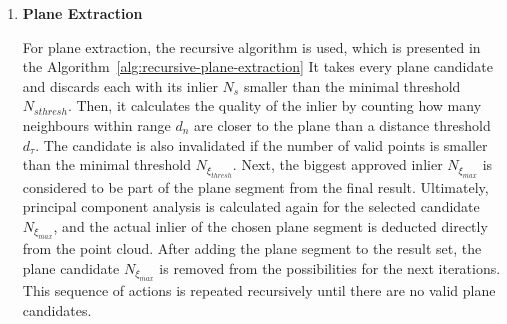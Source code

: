 \begin{enumerate}
\item \textbf{Plane Extraction}

For plane extraction, the recursive algorithm is used, which is presented in the Algorithm~\ref{alg:recursive-plane-extraction}
It takes every plane candidate and discards each with its inlier $N_s$ smaller than the minimal threshold $N_{s thresh}$.
Then, it calculates the quality of the inlier by counting how many neighbours within range $d_n$
are closer to the plane than a distance threshold $d_{\tau}$.
The candidate is also invalidated if the number of valid points is smaller than the minimal threshold $N_{\xi_{thresh}}$.
Next, the biggest approved inlier $N_{\xi_{max}}$ is considered to be part of the plane segment from the final result.
Ultimately, principal component analysis \cite{articlePCAInvention} is calculated again for the selected candidate $N_{\xi_{max}}$,
and the actual inlier of the chosen plane segment is deducted directly from the point cloud.
After adding the plane segment to the result set,
the plane candidate $N_{\xi_{max}}$ is removed from the possibilities for the next iterations.
This sequence of actions is repeated recursively until there are no valid plane candidates.

    \begin{minipage}{\linewidth}
    \begin{algorithm}[H] \label{alg:recursive-plane-extraction}
        \SetAlgoLined
        \caption{Recursive plane extraction \cite{articleFPSLinePrimitivesRGBD}}
    \end{algorithm}
    \end{minipage}


\end{enumerate}
